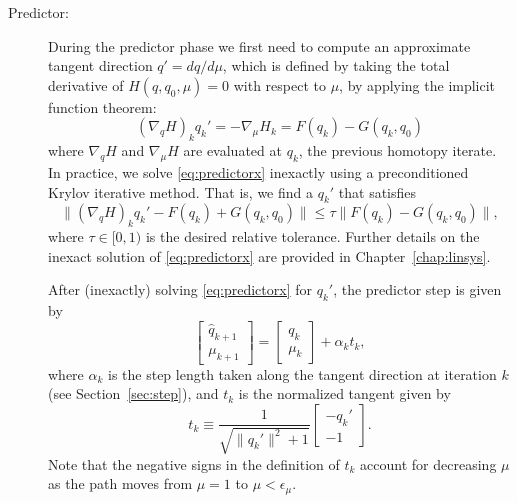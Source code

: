 \begin{description}

  \item[Predictor:] During the predictor phase we first need to compute an
    approximate tangent direction $q' = dq/d\mu$, which is defined by taking the
    total derivative of $H(q,q_0,\mu) = 0$ with respect to $\mu$, \ie by applying the
    implicit function theorem:
    \begin{equation}
      \left(\nabla_q H\right)_{k} q_{k}' = -\nabla_\mu H_{k} = F(q_k)  - G(q_k,q_0)
      \label{eq:predictorx}
    \end{equation}
    where $\nabla_q H$ and $\nabla_\mu H$ are evaluated at $q_k$, the previous
    homotopy iterate.  In practice, we solve \eqref{eq:predictorx} inexactly
    using a preconditioned Krylov iterative method.  That is, we find a $q_{k}'$
    that satisfies
    \begin{equation*}
      \lVert \left(\nabla_q H\right)_{k} q_{k}' - F(q_k) + G(q_k,q_0) \rVert
      \leq \tau \lVert F(q_k)  - G(q_k,q_0) \rVert,
    \end{equation*}
    where $\tau \in [0,1)$ is the desired relative tolerance.  Further details
      on the inexact solution of \eqref{eq:predictorx} are provided in
      Chapter~\ref{chap:linsys}.
    
    After (inexactly) solving \eqref{eq:predictorx} for $q_{k}'$, the predictor
    step is given by
    \begin{equation}\label{eq:pred}
      \begin{bmatrix}
        \hat{q}_{k+1} \\ \mu_{k+1} 
      \end{bmatrix} 
      = \begin{bmatrix}
        q_k \\ \mu_k 
      \end{bmatrix}      
      + \alpha_{k} t_{k},
    \end{equation}
    where $\alpha_{k}$ is the step length taken along the tangent direction at
    iteration $k$ (see Section~\ref{sec:step}), and $t_k$ is the normalized
    tangent given by
    \begin{equation}\label{eq:tk}
      t_{k} \equiv \frac{1}{\sqrt{\|q_{k}'\|^2 + 1}} \begin{bmatrix} -q_k'
        \\ -1 \end{bmatrix}.
    \end{equation}
    Note that the negative signs in the definition of $t_k$ account for
    decreasing $\mu$ as the path moves from $\mu=1$ to $\mu <
\epsilon_\mu$.


\end{description}
